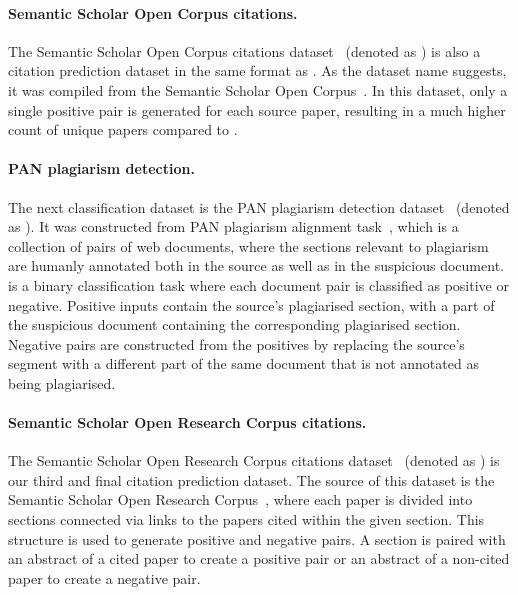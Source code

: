 \paragraph{Semantic Scholar Open Corpus citations.} The Semantic Scholar Open
Corpus citations dataset~\citep{zhou2020multilevel} (denoted as ) is
also a citation prediction dataset in the same format as . As the
dataset name suggests, it was compiled from the Semantic Scholar Open
Corpus~\citep{bhagavatula2018content}. In this dataset, only a single positive
pair is generated for each source paper, resulting in a much higher count of
unique papers compared to .

\paragraph{PAN plagiarism detection.} The next classification dataset is the
PAN plagiarism detection dataset~\citep{zhou2020multilevel} (denoted as
). It was constructed from PAN plagiarism alignment
task~\citep{potthast2013overview}, which is a collection of pairs of web
documents, where the sections relevant to plagiarism are humanly annotated both
in the source as well as in the suspicious document.  is a binary
classification task where each document pair is classified as positive or
negative. Positive inputs contain the source's plagiarised section, with a part of
the suspicious document containing the corresponding plagiarised section.
Negative pairs are constructed from the positives by replacing the source's
segment with a different part of the same document that is not annotated as being
plagiarised.

\paragraph{Semantic Scholar Open Research Corpus citations.} The Semantic
Scholar Open Research Corpus citations dataset~\citep{zhou2020multilevel}
(denoted as ) is our third and final citation prediction dataset.
The source of this dataset is the Semantic Scholar Open Research
Corpus~\citep{lo2019s2orc}, where each paper is divided into sections
connected via links to the papers cited within the given section. This structure is
used to generate positive and negative pairs. A section is paired with an
abstract of a cited paper to create a positive pair or an abstract of
a non-cited paper to create a negative pair.


